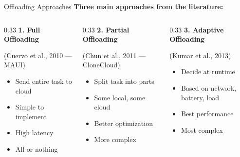 \documentclass[aspectratio=169,12pt]{beamer}
\begin{document}
\begin{frame}{Offloading Approaches}
    \textbf{Three main approaches from the literature:}
    
    \vspace{0.3cm}
    \begin{columns}
        \begin{column}{0.33\textwidth}
            \textbf{1. Full Offloading}
            
            (Cuervo et al., 2010 --- MAUI)
            \begin{itemize}
                \item Send entire task to cloud
                \item Simple to implement
                \item High latency
                \item All-or-nothing
            \end{itemize}
        \end{column}
        \begin{column}{0.33\textwidth}
            \textbf{2. Partial Offloading}
            
            (Chun et al., 2011 --- CloneCloud)
            \begin{itemize}
                \item Split task into parts
                \item Some local, some cloud
                \item Better optimization
                \item More complex
            \end{itemize}
        \end{column}
        \begin{column}{0.33\textwidth}
            \textbf{3. Adaptive Offloading}
            
            (Kumar et al., 2013)
            \begin{itemize}
                \item Decide at runtime
                \item Based on network, battery, load
                \item Best performance
                \item Most complex
            \end{itemize}
        \end{column}
    \end{columns}
\end{frame}
\end{document}
